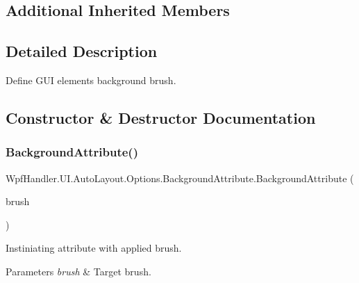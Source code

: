 \subsection*{Additional Inherited Members}


\subsection{Detailed Description}
Define G\+UI element\textquotesingle{}s background brush. 



\subsection{Constructor \& Destructor Documentation}
\mbox{\label{class_wpf_handler_1_1_u_i_1_1_auto_layout_1_1_options_1_1_background_attribute_ade7defa6df0ce136497f5f8d617d645e}} 
\subsubsection{\texorpdfstring{Background\+Attribute()}{BackgroundAttribute()}\hspace{0.1cm}{\footnotesize\ttfamily [1/4]}}
{\footnotesize\ttfamily Wpf\+Handler.\+U\+I.\+Auto\+Layout.\+Options.\+Background\+Attribute.\+Background\+Attribute (\begin{DoxyParamCaption}\item[{\mbox{\hyperlink{class_wpf_handler_1_1_u_i_1_1_color_attribute_afa14c4542d8023b3ddad6aba74993877}{Brush}}}]{brush }\end{DoxyParamCaption})}



Instiniating attribute with applied brush. 


\begin{DoxyParams}{Parameters}
{\em brush} & Target brush.\\
\hline
\end{DoxyParams}


